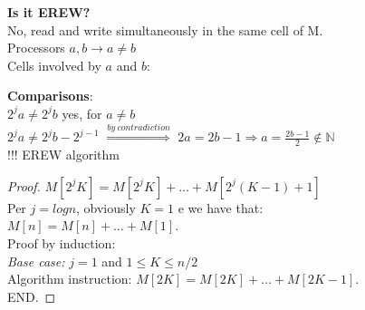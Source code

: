 \textbf{Is it EREW?}\\
No, read and write simultaneously in the same cell of M.\\

Processors $a,b \rightarrow a \neq b$ \\
Cells involved by $a$ and $b$:\\

\textbf{Comparisons}:\\
$2^{j}a \neq 2^{j}b$ yes, for $a \neq b$\\
$2^{j}a \neq 2^{j}b - 2^{j-1}$ $\overset{by \ contradiction}{\Rightarrow}$ $2a = 2b - 1 \Rightarrow a = \frac{2b-1}{2} \notin \mathbb{N}$\\
!!! EREW algorithm

\begin{proof}
$M[2^{j}K] = M[2^{j}K] + \dots + M[2^{j}(K-1)+1]$\\
Per $j=log{n}$, obviously $K=1$ e we have that:\\
$M[n] = M[n] + \dots + M[1]$.\\
Proof by induction:\\
\textit{Base case:} $j=1$ and $1 \leq K \leq n/2$	\\
Algorithm instruction: $M[2K] = M[2K] + \dots + M[2K-1]$.\\
END.
\end{proof}

